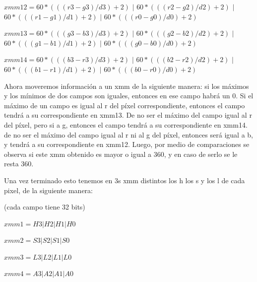 \documentclass[a4paper]{article}
\begin{document}
\begin{enumerate}
\vspace*{0.3cm}	

$xmm12=60*(((r3-g3)/d3)+2)$ $|$ $60*(((r2-g2)/d2)+2)$ $|$ $60*(((r1-g1)/d1)+2)$ $|$ $60*(((r0-g0)/d0)+2)$

\vspace*{0.3cm} 
 
$xmm13=60*(((g3-b3)/d3)+2)$ $|$ $60*(((g2-b2)/d2)+2)$ $|$ $60*(((g1-b1)/d1)+2)$ $|$ $60*(((g0-b0)/d0)+2)$

\vspace*{0.3cm}

$xmm14=60*(((b3-r3)/d3)+2)$ $|$ $60*(((b2-r2)/d2)+2)$ $|$ $60*(((b1-r1)/d1)+2)$ $|$ $60*(((b0-r0)/d0)+2)$	
	
\vspace*{0.3cm}
	 
	 Ahora moveremos información a un xmm de la siguiente manera: si los máximos y los mínimos de dos campos son iguales, entonces en ese campo habrá un 0. Si el máximo de un campo es igual al r del píxel correspondiente, entonces el campo tendrá a su correspondiente en xmm13. De no ser el máximo del campo igual al r del píxel, pero si a g, entonces el campo tendrá a su correspondiente en xmm14. de no ser el máximo del campo igual al r ni al g del píxel, entonces será igual a b, y tendrá a su correspondiente en xmm12. Luego, por medio de comparaciones se observa si este xmm obtenido es mayor o igual a 360, y en caso de serlo se le resta 360.
	
\end{enumerate}

Una vez terminado esto tenemos en 3s xmm distintos los h los s y los l de cada pixel, de la siguiente manera:

\vspace*{0.3cm}

(cada campo tiene 32 bits)	
	
\vspace*{0.3cm}	

$xmm1 = H3|H2|H1|H0$

\vspace*{0.3cm}

$xmm2 = S3|S2|S1|S0$

\vspace*{0.3cm}

$xmm3 = L3|L2|L1|L0$

\vspace*{0.3cm}

$xmm4 = A3|A2|A1|A0$

\vspace*{0.3cm}
\end{document}
